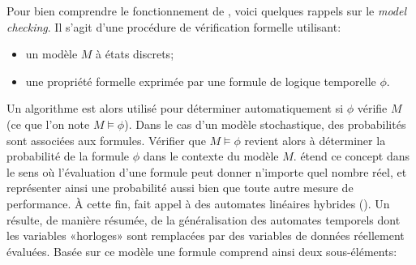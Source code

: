 Pour bien comprendre le fonctionnement de \lsah, voici quelques rappels sur le \textit{model checking}.
Il s'agit d'une procédure de vérification formelle utilisant:
\begin{itemize}
    \item un modèle $M$ à états discrets;
    \item une propriété formelle exprimée par une formule de logique temporelle $\phi$.
\end{itemize}
Un algorithme est alors utilisé pour déterminer automatiquement si $\phi$ vérifie $M$ (ce que l'on note $M\models\phi$).
Dans le cas d'un modèle stochastique, des probabilités sont associées aux formules.
Vérifier que $M\models\phi$ revient alors à déterminer la probabilité de la formule $\phi$ dans le contexte du modèle $M$.
\lsah étend ce concept dans le sens où l'évaluation d'une formule peut donner n'importe quel nombre réel, et représenter ainsi une probabilité aussi bien que toute autre mesure de performance.
À cette fin, \lsah fait appel à des automates linéaires hybrides (\alh).
Un \alh résulte, de manière résumée, de la généralisation des automates temporels dont les variables «horloges» sont remplacées par des variables de données réellement évaluées.
Basée sur ce modèle une formule \lsah comprend ainsi deux sous-éléments:
